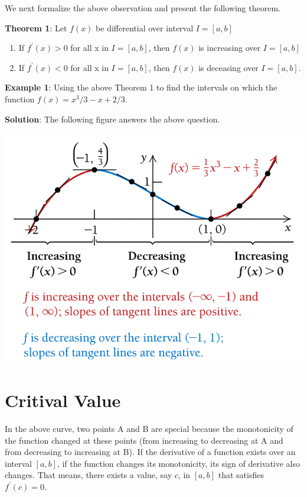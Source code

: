 \documentclass[
]{book}
\begin{document}
We next formalize the above observation and present the following theorem.

\textbf{Theorem 1}: Let \(f(x)\) be differential over interval \(I = [a,b]\)

\begin{enumerate}
\def\labelenumi{\arabic{enumi}.}
\item
  If \(f^\prime(x) > 0\) for all x in \(I = [a, b]\), then \(f(x)\) is increasing over \(I=[a, b]\)
\item
  If \(f^\prime(x) < 0\) for all x in \(I = [a, b]\), then \(f(x)\) is deceasing over \(I=[a,b]\).
\end{enumerate}

\textbf{Example 1}: Using the above Theorem 1 to find the intervals on which the function \(f(x) = x^3/3 - x + 2/3\).

\textbf{Solution}: The following figure answers the above question.

\begin{center}\includegraphics[width=0.6\linewidth]{img07/w07-increasingDecreasingIntervals} \end{center}

\hfill\break

\hypertarget{critival-value}{%
\section{Critival Value}\label{critival-value}}

In the above curve, two points A and B are special because the monotonicity of the function changed at these points (from increasing to decreasing at A and from decreasing to increasing at B). If the derivative of a function exists over an interval \([a, b]\), if the function changes its monotonicity, its sign of derivative also changes. That means, there exists a value, say \(c\), in \([a, b]\) that satisfies \(f^\prime(c) = 0\).
\end{document}
